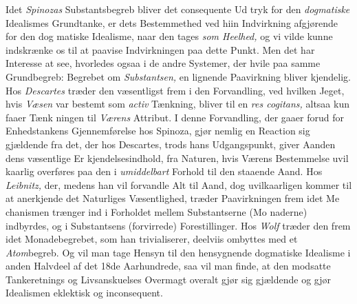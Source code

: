 Idet \emph{Spinozas} Substantsbegreb bliver det consequente Ud\-%
tryk for den \emph{dogmatiske} Idealismes Grundtanke, er dets
Bestemmethed ved hiin Indvirkning afgjørende for den dog\-%
matiske Idealisme, naar den tages \emph{som Heelhed,} og vi vilde
kunne indskrænke os til at paavise Indvirkningen paa dette
Punkt. Men det har Interesse at see, hvorledes ogsaa i de
andre Systemer, der hvile paa samme Grundbegreb: Begrebet
om \emph{Substantsen,} en lignende Paavirkning bliver kjendelig.
Hos \emph{Descartes} træder den væsentligst frem i den Forvandling,
ved hvilken Jeget, hvis \emph{Væsen} var bestemt som \emph{activ}
Tænkning, bliver til en \emph{res cogitans,} altsaa kun faaer Tænk\-%
ningen til \emph{Værens} Attribut. I denne Forvandling, der gaaer
forud for Enhedstankens Gjennemførelse hos Spinoza, gjør
nemlig en Reaction sig gjældende fra det, der hos Descartes,
trods hans Udgangspunkt, giver Aanden dens væsentlige Er\-%
kjendelsesindhold, fra Naturen, hvis Værens Bestemmelse uvil\-%
kaarlig overføres paa den i \emph{umiddelbart} Forhold til den
staaende Aand. Hos \emph{Leibnitz,} der, medens han vil forvandle
Alt til Aand, dog uvilkaarligen kommer til at anerkjende det
Naturliges Væsentlighed, træder Paavirkningen frem idet Me\-%
\setcounter{footnote}{0}%
chanismen trænger ind i Forholdet mellem Substantserne (Mo\-%
naderne) indbyrdes, og i Substantsens (forvirrede) Forestillinger.
Hos \emph{Wolf} træder den frem idet Monadebegrebet, som han
trivialiserer, deelviis ombyttes med et \emph{Atom}begreb. Og vil
man tage Hensyn til den hensygnende dogmatiske Idealisme
i anden Halvdeel af det 18de Aarhundrede, saa vil man finde,
at den modsatte Tankeretnings og Livsanskuelses Overmagt
overalt gjør sig gjældende og gjør Idealismen eklektisk og
inconsequent.

